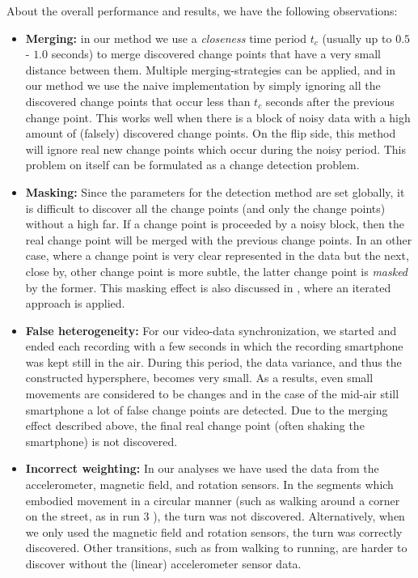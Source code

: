 About the overall performance and results, we have the following observations:
\begin{itemize}
  \item \textbf{Merging:} in our method we use a \emph{closeness} time period $t_c$ (usually up to $0.5$ - $1.0$ seconds) to merge discovered change points that have a very small distance between them.
  Multiple merging-strategies can be applied, and in our method we use the naive implementation by simply ignoring all the discovered change points that occur less than $t_c$ seconds after the previous change point.
  This works well when there is a block of noisy data with a high amount of (falsely) discovered change points.
  On the flip side, this method will ignore real new change points which occur during the noisy period.
  This problem on itself can be formulated as a change detection problem.
  \item \textbf{Masking:} Since the parameters for the detection method are set globally, it is difficult to discover all the change points (and only the change points) without a high \gls{far}.
  If a change point is proceeded by a noisy block, then the real change point will be merged with the previous change points.
  In an other case, where a change point is very clear represented in the data but the next, close by, other change point is more subtle, the latter change point is \emph{masked} by the former.
  This masking effect is also discussed in \cite{inclan1994use}, where an iterated approach is applied.
  \item \textbf{False heterogeneity:} For our video-data synchronization, we started and ended each recording with a few seconds in which the recording smartphone was kept still in the air.
  During this period, the data variance, and thus the constructed hypersphere, becomes very small.
  As a results, even small movements are considered to be changes and in the case of the mid-air still smartphone a lot of false change points are detected.
  Due to the merging effect described above, the final real change point (often shaking the smartphone) is not discovered.
  \item \textbf{Incorrect weighting:} In our analyses we have used the data from the accelerometer, magnetic field, and rotation sensors.
  In the segments which embodied movement in a circular manner (such as walking around a corner on the street, as in run 3 ), the turn was not discovered.
  Alternatively, when we only used the magnetic field and rotation sensors, the turn was correctly discovered.
  Other transitions, such as from walking to running, are harder to discover without the (linear) accelerometer sensor data.
\end{itemize}

